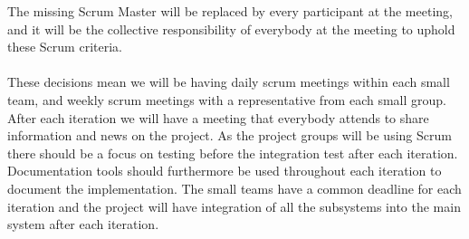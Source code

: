 The missing Scrum Master will be replaced by every participant at the meeting, and it will be the collective responsibility of everybody at the meeting to uphold these Scrum criteria.

\paragraph{}
These decisions mean we will be having daily scrum meetings within each small team, and weekly scrum meetings with a representative from each small group.
After each iteration we will have a meeting that everybody attends to share information and news on the project.
As the project groups will be using Scrum there should be a focus on testing before the integration test after each iteration. Documentation tools should furthermore be used throughout each iteration to document the implementation.
The small teams have a common deadline for each iteration and the project will have integration of all the subsystems into the main system after each iteration.